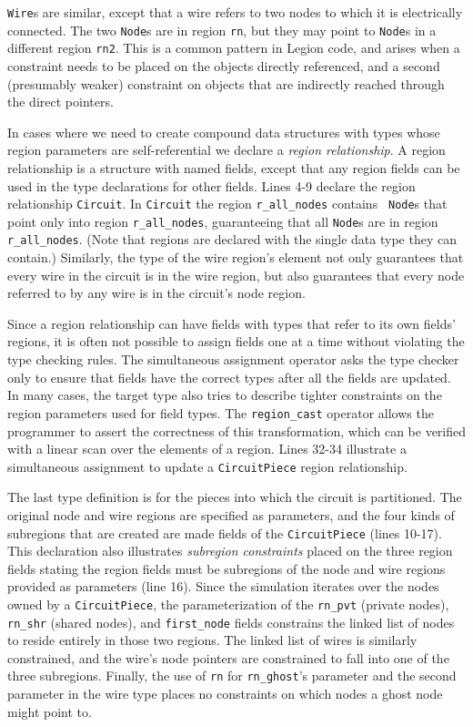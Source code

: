 {\tt Wire}s are similar, except that a wire refers to two nodes to
which it is electrically connected.  The two {\tt Node}s are in region {\tt rn},
but they may point to {\tt Node}s in a different region {\tt rn2}.  
This is a common pattern in Legion code, and
arises when a constraint needs to be placed on the objects directly
referenced, and a second (presumably weaker) constraint on objects
that are indirectly reached through the direct pointers.

In cases where we need to create compound data structures with types whose
region parameters are self-referential we declare a {\em region relationship}.
A region relationship is a structure with named fields, 
except that any region fields can be used in the type declarations
for other fields.  Lines 4-9 declare the region relationship {\tt Circuit}.
In {\tt Circuit} the region {\tt r\_all\_nodes} contains {\tt
Node}s that point only into region {\tt r\_all\_nodes}, guaranteeing that
all {\tt Node}s are in region {\tt r\_all\_nodes}.  (Note that regions are
declared with the single data type they can contain.)  Similarly, the
type of the wire region's element not only guarantees that every wire
in the circuit is in the wire region, but also guarantees that every
node referred to by any wire is in the circuit's node region.

Since a region relationship can have
fields with types that refer to its own fields' regions, it is often not possible
to assign fields one at a time without violating the type checking rules.
The simultaneous assignment operator asks the type checker only to ensure
that fields have the correct types after all the fields are updated.  In
many cases, the target type also tries to describe tighter constraints on
the region parameters used for field types.  The {\tt region\_cast} operator
allows the programmer to assert the correctness of this transformation, which
can be verified with a linear scan over the elements of a region.
Lines 32-34 illustrate a simultaneous
assignment to update a {\tt CircuitPiece} region relationship.

The last type definition is for the pieces into which the circuit is partitioned.
The original node and wire regions are specified as parameters, and the
four kinds of subregions that are created are made fields of the
{\tt CircuitPiece} (lines 10-17).  This declaration also illustrates {\em subregion constraints}
placed on the three region fields stating the region fields must be subregions of the 
node and wire regions provided as parameters (line 16).  Since the simulation 
iterates over the nodes owned by a {\tt CircuitPiece}, the parameterization of the {\tt rn\_pvt} (private nodes),
{\tt rn\_shr} (shared nodes), and {\tt first\_node} fields constrains the linked list of
nodes to reside entirely in those two regions.  The linked list of wires is
similarly constrained, and the wire's node pointers are constrained to fall
into one of the three subregions.
Finally,
the use of {\tt rn} for {\tt rn\_ghost}'s parameter and the second parameter
in the wire type places no constraints on which nodes a ghost node might point
to.


%

%
%
